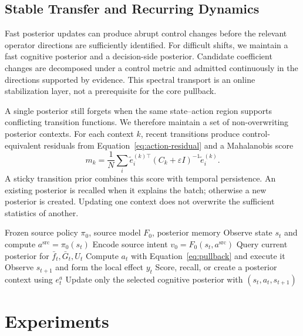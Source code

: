 \documentclass[letterpaper]{article}
\begin{document}
\subsection{Stable Transfer and Recurring Dynamics}

Fast posterior updates can produce abrupt control changes before the relevant
operator directions are sufficiently identified.  For difficult shifts, we
maintain a fast cognitive posterior and a decision-side posterior.  Candidate
coefficient changes are decomposed under a control metric and admitted
continuously in the directions supported by evidence.  This spectral transport
is an online stabilization layer, not a prerequisite for the core pullback.

A single posterior still forgets when the same state--action region supports
conflicting transition functions.  We therefore maintain a set of
non-overwriting posterior contexts.  For each context $k$, recent transitions
produce control-equivalent residuals from Equation~\eqref{eq:action-residual}
and a Mahalanobis score
\begin{equation}
m_k=\frac{1}{N}\sum_i
\tilde e_i^{(k)\top}(C_k+\varepsilon I)^{-1}\tilde e_i^{(k)}.
\end{equation}
A sticky transition prior combines this score with temporal persistence.  An
existing posterior is recalled when it explains the batch; otherwise a new
posterior is created.  Updating one context does not overwrite the sufficient
statistics of another.

\begin{algorithm}[t]
\caption{Online Posterior Control-Equivalent Transport}
\label{alg:pcet}
\begin{algorithmic}[1]
\REQUIRE Frozen source policy $\pi_0$, source model $F_0$, posterior memory
  \STATE Observe state $s_t$ and compute $a^{\mathrm{src}}=\pi_0(s_t)$
  \STATE Encode source intent $v_0=F_0(s_t,a^{\mathrm{src}})$
  \STATE Query current posterior for $\bar f_t,\bar G_t,U_t$
  \STATE Compute $a_t$ with Equation~\eqref{eq:pullback} and execute it
  \STATE Observe $s_{t+1}$ and form the local effect $y_t$
  \STATE Score, recall, or create a posterior context using $e_t^a$
  \STATE Update only the selected cognitive posterior with $(s_t,a_t,s_{t+1})$
\ENDFOR
\end{algorithmic}
\end{algorithm}

\section{Experiments}
\end{document}
